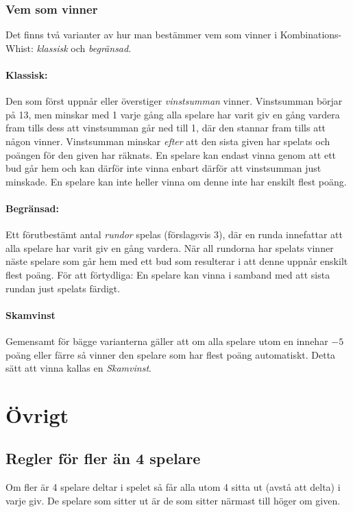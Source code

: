 \documentclass[a4paper]{article}
\begin{document}
			\subsubsection{Vem som vinner}
				\label{sec:winning}
				Det finns två varianter av hur man bestämmer vem som vinner i Kombinations-Whist: \emph{klassisk} och \emph{begränsad}.

				\paragraph{Klassisk:}
					Den som först uppnår eller överstiger \emph{vinstsumman} vinner. Vinstsumman börjar på 13, men minskar med 1 varje gång alla spelare har varit giv en gång vardera fram tills dess att vinstsumman går ned till 1, där den stannar fram tills att någon vinner. Vinstsumman minskar \emph{efter} att den sista given har spelats och poängen för den given har räknats. En spelare kan endast vinna genom att ett bud går hem och kan därför inte vinna enbart därför att vinstsumman just minskade. En spelare kan inte heller vinna om denne inte har enskilt flest poäng.

				\paragraph{Begränsad:}
					Ett förutbestämt antal \emph{rundor} spelas (förslagsvis 3), där en runda innefattar att alla spelare har varit giv en gång vardera. När all rundorna har spelats vinner näste spelare som går hem med ett bud som resulterar i att denne uppnår enskilt flest poäng. För att förtydliga: En spelare kan vinna i samband med att sista rundan just spelats färdigt.

				\paragraph{Skamvinst} Gemensamt för bägge varianterna gäller att om alla spelare utom en innehar $-5$ poäng eller färre så vinner den spelare som har flest poäng automatiskt. Detta sätt att vinna kallas en \emph{Skamvinst}.

	\section{Övrigt}
		\subsection{Regler för fler än 4 spelare}
			Om fler är 4 spelare deltar i spelet så får alla utom 4 sitta ut (avstå att delta) i varje giv. De spelare som sitter ut är de som sitter närmast till höger om given.
		
\end{document}
